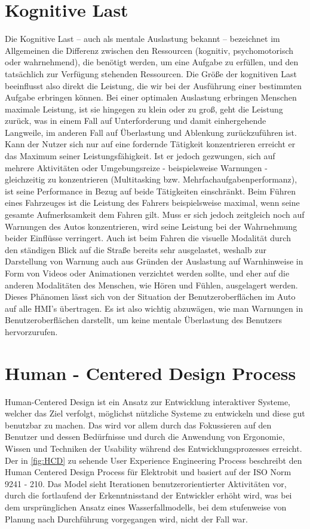 \section{Kognitive Last}
Die Kognitive Last – auch als mentale Auslastung bekannt – bezeichnet im Allgemeinen die Differenz zwischen den Ressourcen (kognitiv, psychomotorisch oder wahrnehmend), die benötigt werden, um eine Aufgabe zu erfüllen, und den tatsächlich zur Verfügung stehenden Ressourcen. Die Größe der kognitiven Last beeinflusst also direkt die Leistung, die wir bei der Ausführung einer bestimmten Aufgabe erbringen können. Bei einer optimalen Auslastung erbringen Menschen maximale Leistung, ist sie hingegen zu klein oder zu groß, geht die Leistung zurück, was in einem Fall auf Unterforderung und damit einhergehende Langweile, im anderen Fall auf Überlastung und Ablenkung zurückzuführen ist\cite{Miucic.2019}. 
Kann der Nutzer sich nur auf eine fordernde Tätigkeit konzentrieren erreicht er das Maximum seiner Leistungsfähigkeit.
Ist er jedoch gezwungen, sich auf mehrere Aktivitäten oder Umgebungsreize - beispielsweise Warnungen - gleichzeitig zu konzentrieren (Multitasking bzw. Mehrfachaufgabenperformanz), ist seine Performance in Bezug auf beide Tätigkeiten einschränkt.
Beim Führen eines Fahrzeuges ist die Leistung des Fahrers beispielsweise maximal, wenn seine gesamte Aufmerksamkeit dem Fahren gilt.
Muss er sich jedoch zeitgleich noch auf Warnungen des Autos konzentrieren, wird seine Leistung bei der Wahrnehmung beider Einflüsse verringert.
Auch ist beim Fahren die visuelle Modalität durch den ständigen Blick auf die Straße bereits sehr ausgelastet, weshalb zur Darstellung von Warnung auch aus Gründen der Auslastung auf Warnhinweise in Form von Videos oder Animationen verzichtet werden sollte, und eher auf die anderen Modalitäten des Menschen, wie Hören und Fühlen, ausgelagert werden.
Dieses Phänomen lässt sich von der Situation der Benutzeroberflächen im Auto auf alle HMI's übertragen.
Es ist also wichtig abzuwägen, wie man Warnungen in Benutzeroberflächen darstellt, um keine mentale Überlastung des Benutzers hervorzurufen. 

\section{Human - Centered  Design Process}
Human-Centered Design ist ein Ansatz zur Entwicklung interaktiver Systeme, welcher das Ziel verfolgt, möglichst nützliche Systeme zu entwickeln und diese gut benutzbar zu machen.
Das wird vor allem durch das Fokussieren auf den Benutzer und dessen Bedürfnisse und durch die Anwendung von Ergonomie, Wissen und Techniken der Usability während des Entwicklungsprozesses erreicht\cite{.}.
Der in \cref{fig:HCD} zu sehende User Experience Engineering Process beschreibt den Human Centered Design Process für Elektrobit und basiert auf der ISO Norm 9241 - 210.
Das Model sieht Iterationen benutzerorientierter Aktivitäten vor, durch die fortlaufend der Erkenntnisstand der Entwickler erhöht wird, was bei dem ursprünglichen Ansatz eines Wasserfallmodells, bei dem stufenweise von Planung nach Durchführung vorgegangen wird, nicht der Fall war.

